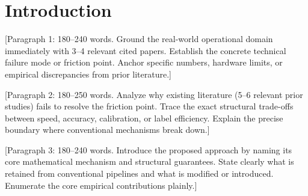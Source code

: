 \documentclass[a4paper,fleqn]{cas-sc}
\begin{document}
\maketitle

%
%
%
%
%

\section{Introduction}\label{sec:intro}

[Paragraph 1: 180--240 words. Ground the real-world operational domain immediately with 3--4 relevant cited papers. Establish the concrete technical failure mode or friction point. Anchor specific numbers, hardware limits, or empirical discrepancies from prior literature.]

[Paragraph 2: 180--250 words. Analyze why existing literature (5--6 relevant prior studies) fails to resolve the friction point. Trace the exact structural trade-offs between speed, accuracy, calibration, or label efficiency. Explain the precise boundary where conventional mechanisms break down.]

[Paragraph 3: 180--240 words. Introduce the proposed approach by naming its core mathematical mechanism and structural guarantees. State clearly what is retained from conventional pipelines and what is modified or introduced. Enumerate the core empirical contributions plainly.]

\end{document}
